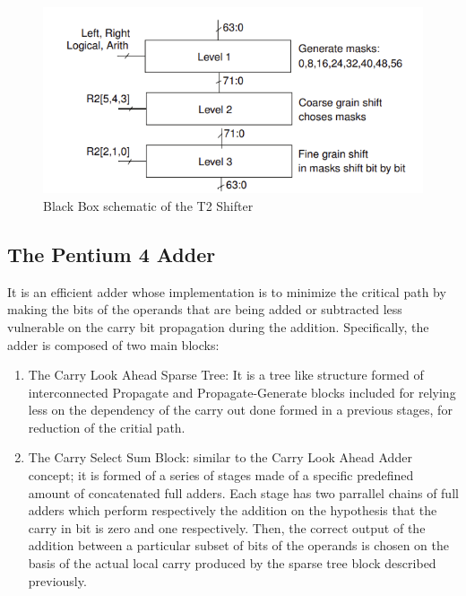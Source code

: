     \begin{figure}[h!]
        \centering
        \includegraphics[scale = 0.8]
        {chapters/figures/T2Shifter}
        \caption{Black Box schematic of the T2 Shifter}
        \label{fig:T2Shifter}
        \end{figure}
    

    \subsection{ The Pentium 4 Adder}
    It is an efficient adder whose implementation is to minimize the critical path by making the bits of the operands that are being added or subtracted less vulnerable on 
    the carry bit propagation during the addition. Specifically, the adder is composed of two main blocks:

\begin{enumerate}
    \item The Carry Look Ahead Sparse Tree: It is a tree like structure formed of interconnected Propagate and Propagate-Generate blocks included for relying less on the dependency of the carry out done
    formed in a previous stages, for reduction of the critial path.
    \item The Carry Select Sum Block: similar to the Carry Look Ahead Adder concept; it is formed of a series of stages made of a specific predefined amount of concatenated full adders.
    Each stage has two parrallel chains of full adders  which perform respectively the addition on the hypothesis that the carry in bit is zero and one respectively.
    Then, the correct output of the addition between a particular subset of bits of the operands is chosen on the basis of the actual local carry produced by the sparse tree block described previously.
    
\end{enumerate}

